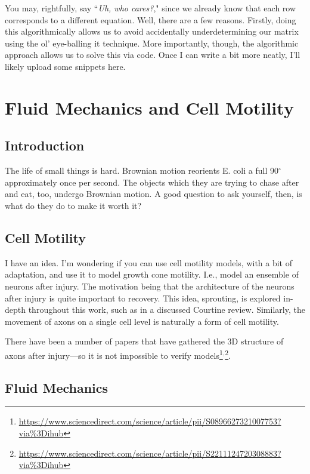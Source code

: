 You may, rightfully, say ``\textit{Uh, who cares?}," since we already know that each row corresponds to a different equation. Well, there are a few reasons. Firstly, doing this algorithmically allows us to avoid accidentally underdetermining our matrix using the ol' eye-balling it technique. More importantly, though, the algorithmic approach allows us to solve this via code. Once I can write a bit more neatly, I'll likely upload some snippets here. 



\chapter{Fluid Mechanics and Cell Motility}

\section{Introduction}

The life of small things is hard. Brownian motion reorients E. coli a full 90$^\circ$ approximately once per second. The objects which they are trying to chase after and eat, too, undergo Brownian motion. A good question to ask yourself, then, is what do they do to make it worth it?

\section{Cell Motility}

I have an idea. I'm wondering if you can use cell motility models, with a bit of adaptation, and use it to model growth cone motility. I.e., model an ensemble of neurons after injury. The motivation being that the architecture of the neurons after injury is quite important to recovery. This idea, sprouting, is explored in-depth throughout this work, such as in a discussed Courtine review. Similarly, the movement of axons on a single cell level is naturally a form of cell motility. \newline

There have been a number of papers that have gathered the 3D structure of axons after injury---so it is not impossible to verify models\footnote{\url{https://www.sciencedirect.com/science/article/pii/S0896627321007753?via\%3Dihub}}$^,$\footnote{\url{https://www.sciencedirect.com/science/article/pii/S2211124720308883?via\%3Dihub}}. 


\section{Fluid Mechanics}

